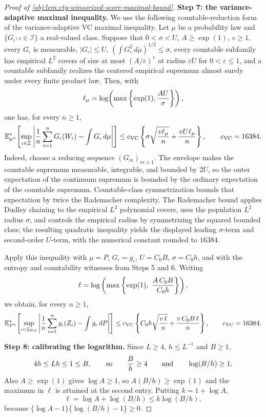 \documentclass[11pt]{article}
\begin{document}
\begin{proof}[Proof of \cref{obj:lem:cty-winsorized-score-maximal-bound}]
\textbf{Step 7: the variance-adaptive maximal inequality.}  We use the following countable-reduction form of the variance-adaptive VC maximal inequality.  Let \(\mu\) be a probability law and \(\{G_\iota:\iota\in\mathcal I\}\) a real-valued class.  Suppose that \(0<\sigma<U\), \(A\geq\exp(1)\), \(v\geq1\), every \(G_\iota\) is measurable, \(|G_\iota|\leq U\), \((\int G_\iota^2\,d\mu)^{1/2}\leq\sigma\), every countable subfamily has empirical \(L^2\) covers of size at most \((A/\varepsilon)^v\) at radius \(\varepsilon U\) for \(0<\varepsilon\leq1\), and a countable subfamily realizes the centered empirical supremum almost surely under every finite product law.  Then, with
\[
\ell_{\mu}=\log\!\left(\max\left\{\exp(1),{AU\over\sigma}\right\}\right),
\]
one has, for every \(n\geq1\),
\[
\mathbb E_{\mu^n}^{*}\!\left[
\sup_{\iota\in\mathcal I}
\left|{1\over n}\sum_{i=1}^n G_\iota(W_i)-\int G_\iota\,d\mu\right|
\right]
\leq
c_{\mathrm{VC}}\left\{
\sigma\sqrt{{v\ell_{\mu}\over n}}
+{vU\ell_{\mu}\over n}
\right\},
\qquad c_{\mathrm{VC}}=16384 .
\]
Indeed, choose a reducing sequence \((G_m)_{m\geq1}\).  The envelope makes the countable supremum measurable, integrable, and bounded by \(2U\), so the outer expectation of the continuum supremum is bounded by the ordinary expectation of the countable supremum.  Countable-class symmetrization bounds that expectation by twice the Rademacher complexity.  The Rademacher bound applies Dudley chaining to the empirical \(L^2\) polynomial covers, uses the population \(L^2\) radius \(\sigma\), and controls the empirical radius by symmetrizing the squared bounded class; the resulting quadratic inequality yields the displayed leading \(\sigma\)-term and second-order \(U\)-term, with the numerical constant rounded to \(16384\).

Apply this inequality with \(\mu=P\), \(G_\iota=g_\iota\), \(U=C_0B\), \(\sigma=C_0h\), and with the entropy and countability witnesses from Steps 5 and 6.  Writing
\[
\ell=
\log\left(\max\left\{\exp(1),\ {A\,C_0B\over C_0h}\right\}\right),
\]
we obtain, for every \(n\geq1\),
\[
\mathbb E_{P^n}^{*}\!\left[
\sup_{\iota\in\mathcal I_{P,h}}
\left|
{1\over n}\sum_{i=1}^n g_\iota(Z_i)-\int g_\iota\,dP
\right|
\right]
\leq
c_{\mathrm{VC}}
\left\{
C_0h\sqrt{{v\,\ell\over n}}
+
{v\,C_0B\,\ell\over n}
\right\},
\qquad
c_{\mathrm{VC}}=16384 .
\]

\textbf{Step 8: calibrating the logarithm.}  Since \(L\geq4\), \(h\leq L^{-1}\) and \(B\geq1\),
\[
4h\leq Lh\leq1\leq B,
\qquad\text{so}\qquad
{B\over h}\geq4
\qquad\text{and}\qquad
\log(B/h)\geq1 .
\]
Also \(A\geq\exp(1)\) gives \(\log A\geq1\), so \(A(B/h)\geq\exp(1)\) and the maximum in \(\ell\) is attained at the second entry.  Putting \(k=1+\log A\),
\[
\ell=\log A+\log(B/h)\leq k\log(B/h),
\]
because \(\{\log A-1\}\{\log(B/h)-1\}\geq0\).


\end{proof}
\end{document}
